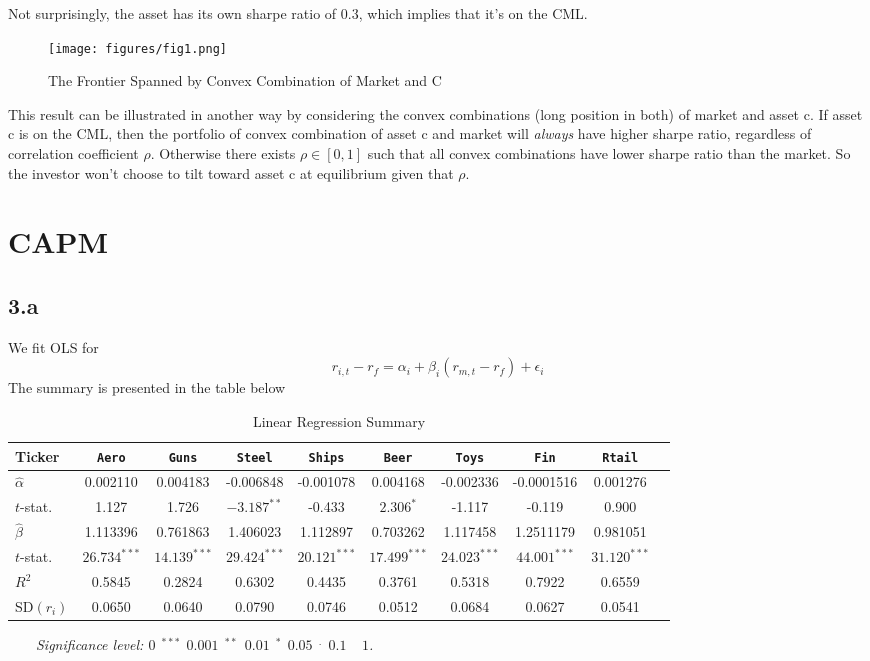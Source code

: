 \documentclass[10 pt]{hwtemplate} %
\begin{document}
Not surprisingly, the asset has its own sharpe ratio of $0.3$, which implies that it's on the CML.
\begin{figure}[H]
  \centering
  \captionsetup{justification=centering}
  \caption{\label{fig:span}The Frontier Spanned by Convex Combination of Market and C}
  \vspace{-10pt}
  \texttt{[image: figures/fig1.png]}
\end{figure}
This result can be illustrated in another way by considering the convex combinations (long position in both) of market and asset c. If asset c is on the CML, then the portfolio of convex combination of asset c and market will \textit{always} have higher sharpe ratio, regardless of correlation coefficient $\rho$. Otherwise there exists $\rho \in [0,1]$ such that all convex combinations have lower sharpe ratio than the market. So the investor won't choose to tilt toward asset c at equilibrium given that $\rho$.



\section{CAPM}
\subsection*{3.a} 
We fit OLS for 
$$
r_{i,t} - r_f = \alpha_i + \beta_i (r_{m,t}-r_f) + \epsilon_i
$$
The summary is presented in the table below
\begin{table}[htbp]
  \begin{center}
  \captionsetup{justification=centering}
  \caption{\label{tab:lm}Linear Regression Summary}
  \small
    \begin{tabular}{lccccccccc}
    \toprule
      Ticker & \texttt{Aero} & \texttt{Guns} & \texttt{Steel}& \texttt{Ships}& \texttt{Beer}& \texttt{Toys}& \texttt{Fin}&  \texttt{Rtail}\\
      \midrule
      $\hat{\alpha}$ & 0.002110  &0.004183  & -0.006848  &-0.001078 & 0.004168  &-0.002336&
      -0.0001516 & 0.001276 \\
      $t$-stat. & 1.127  &1.726  & $-3.187^{**}$  &-0.433 & $2.306^{*}$  &-1.117&
      -0.119 & 0.900 \\
      \midrule
      $\hat{\beta}$ & 1.113396  &0.761863  & 1.406023  &1.112897 & 0.703262  &1.117458&
      1.2511179 & 0.981051 \\
      $t$-stat. & $26.734^{***}$  &$14.139^{***}$  & $29.424^{***}$  &$20.121^{***}$ & $17.499^{***}$  &$24.023^{***}$&
      $44.001^{***}$ & $31.120^{***}$ \\
      \midrule
      $R^2$ & 0.5845  &0.2824  & 0.6302  &0.4435 & 0.3761  &0.5318&
      0.7922 & 0.6559 \\
      SD$(r_i)$ & 0.0650 & 0.0640 & 0.0790 & 0.0746 & 0.0512 & 0.0684 & 0.0627 & 0.0541\\
    \bottomrule
    \end{tabular}
  \end{center}
  \vspace{-8pt}
  \scriptsize~~~~\textit{Significance level: $0~~^{***}~~0.001~~^{**}~~0.01~~^{*}~~0.05~~^{.}~~0.1~~~~~1$.}
\end{table}
\normalsize
\end{document}
